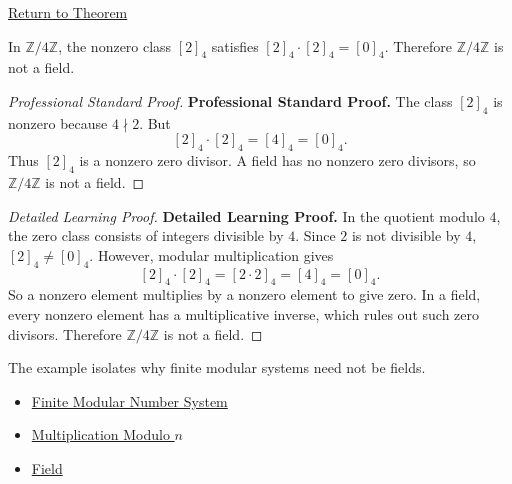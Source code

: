 \newpage
{}
\label{prf:z-mod-four-has-zero-divisors}

\begin{remark*}[Return]
\hyperref[thm:z-mod-four-has-zero-divisors]{Return to Theorem}
\end{remark*}

\begin{theorem*}
In \(\mathbb{Z}/4\mathbb{Z}\), the nonzero class \([2]_4\) satisfies
\([2]_4\cdot[2]_4=[0]_4\). Therefore \(\mathbb{Z}/4\mathbb{Z}\) is not a
field.
\end{theorem*}

\begin{proof}[Professional Standard Proof]
\LRAProofBodyStart
\textbf{Professional Standard Proof.}
The class \([2]_4\) is nonzero because \(4\nmid 2\). But
\[
[2]_4\cdot[2]_4=[4]_4=[0]_4.
\]
Thus \([2]_4\) is a nonzero zero divisor. A field has no nonzero zero
divisors, so \(\mathbb{Z}/4\mathbb{Z}\) is not a field.
\end{proof}

\begin{proof}[Detailed Learning Proof]
\LRAProofBodyStart
\textbf{Detailed Learning Proof.}
In the quotient modulo \(4\), the zero class consists of integers divisible
by \(4\). Since \(2\) is not divisible by \(4\), \([2]_4\neq[0]_4\). However,
modular multiplication gives
\[
[2]_4\cdot[2]_4=[2\cdot2]_4=[4]_4=[0]_4.
\]
So a nonzero element multiplies by a nonzero element to give zero. In a field,
every nonzero element has a multiplicative inverse, which rules out such zero
divisors. Therefore \(\mathbb{Z}/4\mathbb{Z}\) is not a field.
\end{proof}

\begin{remark*}
The example isolates why finite modular systems need not be fields.
\end{remark*}

\begin{dependencies}
\begin{itemize}
  \item \hyperref[def:finite-modular-number-system]{Finite Modular Number System}
  \item \hyperref[def:multiplication-modulo-n]{Multiplication Modulo \(n\)}
  \item \hyperref[def:abstract-field]{Field}
\end{itemize}
\end{dependencies}

\clearpage
